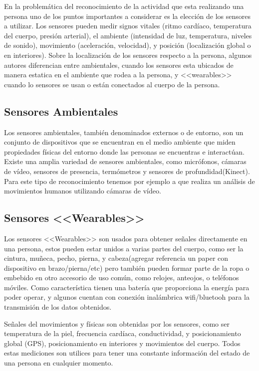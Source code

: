 En la problemática del reconocimiento de la actividad que esta realizando una persona uno de los puntos importantes a considerar es la elección de los sensores a utilizar. Los sensores pueden medir signos vitales (ritmo cardíaco, temperatura del cuerpo, presión arterial), el ambiente (intensidad de luz, temperatura, niveles de sonido), movimiento (aceleración, velocidad), y posición (localización global o en interiores).
Sobre la localización de los sensores respecto a la persona, algunos autores \cite{ReyesOrtiz2015} diferencian entre ambientales, cuando los sensores esta ubicados de manera estatica en el ambiente que rodea a la persona, y <<wearables>> cuando lo sensores se usan o están conectados al cuerpo de la persona.

\subsection{Sensores Ambientales}

Los sensores ambientales, también denominados externos o de entorno, son un conjunto de dispositivos que se encuentran en el medio ambiente que miden propiedades físicas del entorno donde las personas se encuentras e interactúan. Existe una amplia variedad de sensores ambientales, como micrófonos, cámaras de vídeo, sensores de presencia, termómetros y sensores de profundidad(Kinect). Para este tipo de reconocimiento tenemos por ejemplo a \cite{Poppe2007} que realiza un análisis de movimientos humanos utilizando cámaras de vídeo.

\subsection{Sensores <<Wearables>>}

Los sensores <<Wearables>> son usados para obtener señales directamente en una persona, estos pueden estar unidos a varias partes del cuerpo, como ser la cintura, muñeca, pecho, pierna, y cabeza(agregar referencia un paper con dispositivo en brazo/pierna/etc) pero también pueden formar parte de la ropa o embebido en otro accesorio de uso común, como relojes, anteojos, o teléfonos móviles. Como característica tienen una batería que proporciona la energía para poder operar, y algunos cuentan con conexión inalámbrica wifi/bluetooh para la transmisión de los datos obtenidos.

Señales del movimientos y físicas son obtenidas por los sensores, como ser temperatura de la piel, frecuencia cardíaca, conductividad, y posicionamiento global (GPS), posicionamiento en interiores y movimientos del cuerpo. Todos estas mediciones son utilices para tener una constante información del estado de una persona en cualquier momento.

